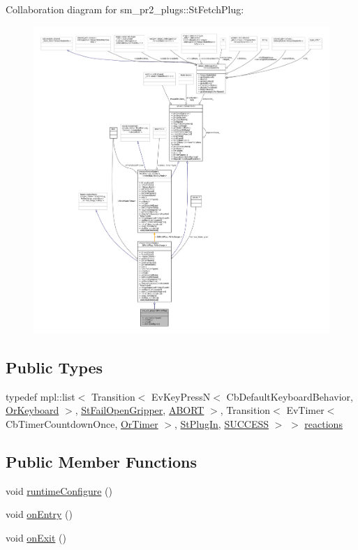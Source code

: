 Collaboration diagram for sm\+\_\+pr2\+\_\+plugs\+:\+:St\+Fetch\+Plug\+:
\nopagebreak
\begin{figure}[H]
\begin{center}
\leavevmode
\includegraphics[width=350pt]{structsm__pr2__plugs_1_1StFetchPlug__coll__graph}
\end{center}
\end{figure}
\subsection*{Public Types}
\begin{DoxyCompactItemize}
\item 
typedef mpl\+::list$<$ Transition$<$ Ev\+Key\+PressN$<$ Cb\+Default\+Keyboard\+Behavior, \hyperlink{classsm__pr2__plugs_1_1OrKeyboard}{Or\+Keyboard} $>$, \hyperlink{structsm__pr2__plugs_1_1StFailOpenGripper}{St\+Fail\+Open\+Gripper}, \hyperlink{classABORT}{A\+B\+O\+RT} $>$, Transition$<$ Ev\+Timer$<$ Cb\+Timer\+Countdown\+Once, \hyperlink{classsm__pr2__plugs_1_1OrTimer}{Or\+Timer} $>$, \hyperlink{structsm__pr2__plugs_1_1StPlugIn}{St\+Plug\+In}, \hyperlink{classSUCCESS}{S\+U\+C\+C\+E\+SS} $>$ $>$ \hyperlink{structsm__pr2__plugs_1_1StFetchPlug_a419655234103a8527bd89d0a02e1f0c0}{reactions}
\end{DoxyCompactItemize}
\subsection*{Public Member Functions}
\begin{DoxyCompactItemize}
\item 
void \hyperlink{structsm__pr2__plugs_1_1StFetchPlug_ab366cd931391170e7c7fa3e591c66d73}{runtime\+Configure} ()
\item 
void \hyperlink{structsm__pr2__plugs_1_1StFetchPlug_a2f3ce8eeed2d552fa7abb3b13bc6a97c}{on\+Entry} ()
\item 
void \hyperlink{structsm__pr2__plugs_1_1StFetchPlug_a31beba279787813c491a3460118c786d}{on\+Exit} ()
\end{DoxyCompactItemize}
